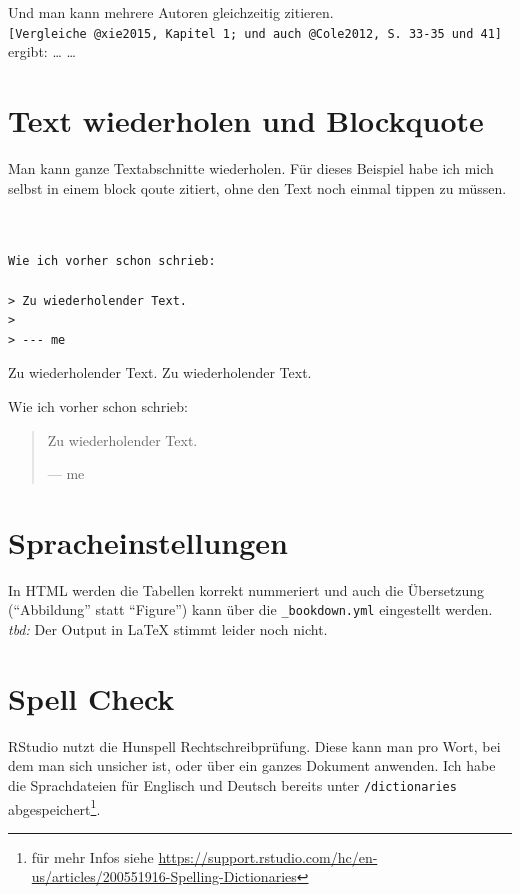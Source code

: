 \documentclass[]{book}
\let\rmarkdownfootnote\footnote%
\def\footnote{\protect\rmarkdownfootnote}
\theoremstyle{definition}
\theoremstyle{definition}
\theoremstyle{remark}
\begin{document}
Und man kann mehrere Autoren gleichzeitig zitieren.\\
\texttt{{[}Vergleiche\ @xie2015,\ Kapitel\ 1;\ und\ auch\ @Cole2012,\ S.\ 33-35\ und\ 41{]}}
ergibt: \ldots{} \citetext{\citealp[Vergleiche][Kapitel
1]{xie2015}; \citealp[und auch][S. 33-35 und 41]{Cole2012}} \ldots{}

\section{Text wiederholen und
Blockquote}\label{text-wiederholen-und-blockquote}

Man kann ganze Textabschnitte wiederholen. Für dieses Beispiel habe ich
mich selbst in einem block qoute zitiert, ohne den Text noch einmal
tippen zu müssen.

\begin{verbatim}


Wie ich vorher schon schrieb:

> Zu wiederholender Text.
>
> --- me
\end{verbatim}

Zu wiederholender Text. Zu wiederholender Text.

Wie ich vorher schon schrieb:

\begin{quote}
Zu wiederholender Text.

--- me
\end{quote}

\section{Spracheinstellungen}\label{spracheinstellungen}

In HTML werden die Tabellen korrekt nummeriert und auch die Übersetzung
(``Abbildung'' statt ``Figure'') kann über die \texttt{\_bookdown.yml}
eingestellt werden. \emph{tbd:} Der Output in LaTeX stimmt leider noch
nicht.

\section{Spell Check}\label{spell-check}

RStudio nutzt die Hunspell Rechtschreibprüfung. Diese kann man pro Wort,
bei dem man sich unsicher ist, oder über ein ganzes Dokument anwenden.
Ich habe die Sprachdateien für Englisch und Deutsch bereits unter
\texttt{/dictionaries} abgespeichert\footnote{für mehr Infos siehe
  \url{https://support.rstudio.com/hc/en-us/articles/200551916-Spelling-Dictionaries}}.
\end{document}
